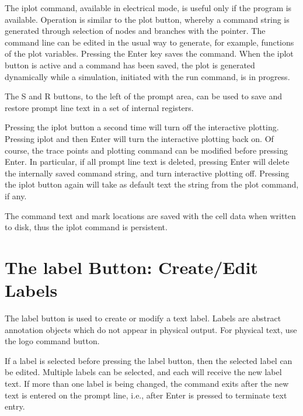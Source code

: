 The {\cb iplot} command, available in electrical mode, is useful only
if the {\WRspice} program is available.  Operation is similar to the
{\cb plot} button, whereby a command string is generated through
selection of nodes and branches with the pointer.  The command line
can be edited in the usual way to generate, for example, functions of
the plot variables.  Pressing the {\kb Enter} key saves the command. 
When the {\cb iplot} button is active and a command has been saved,
the plot is generated dynamically while a simulation, initiated with
the {\cb run} command, is in progress.

The {\cb S} and {\cb R} buttons, to the left of the prompt area, can be
used to save and restore prompt line text in a set of internal registers.

Pressing the {\cb iplot} button a second time will turn off the
interactive plotting.  Pressing {\cb iplot} and then {\kb Enter} will
turn the interactive plotting back on.  Of course, the trace points
and plotting command can be modified before pressing {\kb Enter}.  In
particular, if all prompt line text is deleted, pressing {\kb Enter}
will delete the internally saved command string, and turn interactive
plotting off.  Pressing the {\cb iplot} button again will take as
default text the string from the {\cb plot} command, if any.

The command text and mark locations are saved with the cell data
when written to disk, thus the {\cb iplot} command is persistent.


\section{The {\cb label} Button: Create/Edit Labels}
\label{labelbut}

The {\cb label} button is used to create or modify a text label. 
Labels are abstract annotation objects which do not appear in physical
output.  For physical text, use the {\cb logo} command button.

If a label is selected before pressing the {\cb label} button, then
the selected label can be edited.  Multiple labels can be selected,
and each will receive the new label text.  If more than one label is
being changed, the command exits after the new text is entered on the
prompt line, i.e., after {\kb Enter} is pressed to terminate text
entry.

